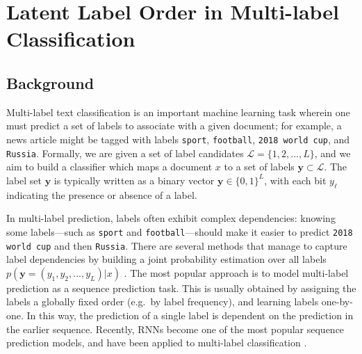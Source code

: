\section{Latent Label Order in Multi-label Classification} \label{sec:2-1}

\subsection{Background}

Multi-label text classification is an important machine learning task wherein one must predict a set of labels to associate with a given document; for example, a news article might be tagged with labels \texttt{sport}, \texttt{football}, \texttt{2018 world cup}, and \texttt{Russia}. Formally, we are given a set of label candidates $\mathcal{L}=\{1,2,...,L\}$, and we aim to build a classifier which maps a document $x$ to a set of labels $\mathbf{y}\subset \mathcal{L}$. The label set $\mathbf{y}$ is typically written as a binary vector $\mathbf{y}\in \{0,1\}^L$, with each bit $y_{\ell}$ indicating the presence or absence of a label.

In multi-label prediction, labels often exhibit complex dependencies: knowing some labels---such as \texttt{sport} and \texttt{football}---should make it easier to predict \texttt{2018 world cup} and then \texttt{Russia}. There are several methods that manage to capture label dependencies by building a joint probability estimation over all labels $p(\mathbf{y}=(y_1,y_2,...,y_L)|x)$ \cite{ghamrawi2005collective,read2009classifier,DBLP:conf/icml/DembczynskiCH10,li2016conditional}. 
The most popular approach is to model multi-label prediction as a sequence prediction task. This is usually obtained by assigning the labels a globally fixed order (e.g.\ by label frequency), and learning labels one-by-one. In this way, the prediction of a single label is dependent on the prediction in the earlier sequence. Recently, RNNs become one of the most popular sequence prediction models, and have been applied to multi-label classification \cite{DBLP:conf/cvpr/WangYMHHX16,DBLP:journals/corr/ZhangWSZL16,DBLP:conf/icpr/JinN16,DBLP:conf/iccv/WangCLXL17,DBLP:journals/corr/abs-1709-08553,DBLP:conf/aaai/ChenCYW18,DBLP:journals/corr/abs-1806-04822}.  

